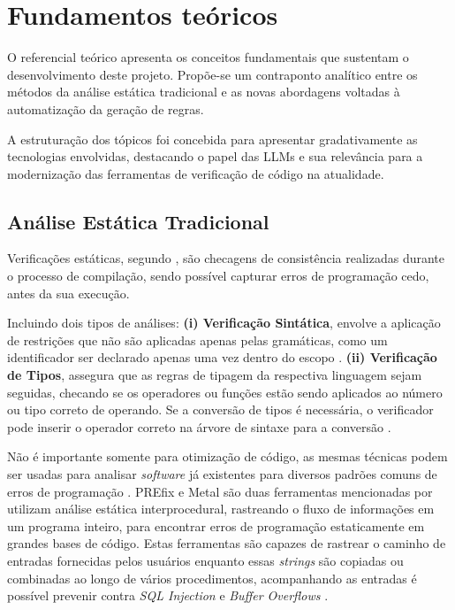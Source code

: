 \documentclass[
    12pt,                %
    openright,           %
    oneside,             %
    a4paper,             %
    english,             %
    brazil               %
]{abntex2}
\begin{document}
\section{Fundamentos teóricos}
\label{cap:referencial}
\par
O referencial teórico apresenta os conceitos fundamentais que sustentam o desenvolvimento deste projeto. 
Propõe-se um contraponto analítico entre os métodos da análise estática tradicional e as novas abordagens voltadas à automatização da geração de regras.
\par 
A estruturação dos tópicos foi concebida para apresentar gradativamente as tecnologias envolvidas, destacando o papel das LLMs e sua relevância para a modernização das ferramentas de verificação de código na atualidade.

\subsection{Análise Estática Tradicional}
\label{sec:analisetradicional}
\par
Verificações estáticas, segundo , são checagens de consistência realizadas durante o processo de compilação, sendo possível capturar erros de programação cedo, antes da sua execução. 
\par
Incluindo dois tipos de análises: 
\textbf{(i) Verificação Sintática}, envolve a aplicação de restrições que não são aplicadas apenas pelas gramáticas, como um identificador ser declarado apenas uma vez dentro do escopo \cite{aho2007compilers}.
\textbf{(ii) Verificação de Tipos}, assegura que as regras de tipagem da respectiva linguagem sejam seguidas, checando se os operadores ou funções estão sendo aplicados ao número ou tipo correto de operando.
Se a conversão de tipos é necessária, o verificador pode inserir o operador correto na árvore de sintaxe para a conversão \cite{aho2007compilers}.
\par
Não é importante somente para otimização de código, as mesmas técnicas podem ser usadas para analisar \textit{software} já existentes para diversos padrões comuns de erros de programação \cite{aho2007compilers}.
PREfix e Metal são duas ferramentas mencionadas por  utilizam análise estática interprocedural, rastreando o fluxo de informações em um programa inteiro, para encontrar erros de programação estaticamente em grandes bases de código.
Estas ferramentas são capazes de rastrear o caminho de entradas fornecidas pelos usuários enquanto essas \textit{strings} são copiadas ou combinadas ao longo de vários procedimentos, acompanhando as entradas é possível prevenir contra \textit{SQL Injection} e \textit{Buffer Overflows} \cite{aho2007compilers}.
\end{document}
